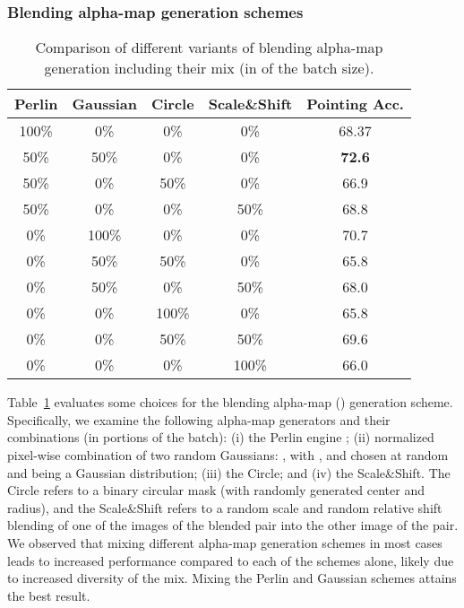 \documentclass[10pt,twocolumn,letterpaper]{article}
\newcommand\secvspace{\vspace{-0.0cm}}
\newcommand\figvspace{\vspace{-0.2cm}}
\begin{document}
\subsubsection{Blending alpha-map generation schemes}\label{sec:abl_alpha}
\secvspace
\begin{table}[h]
\begin{center}
\begin{tabular}{ ccccc }


 \toprule
 Perlin & Gaussian & Circle & Scale\&Shift & Pointing Acc.\\ 
 \midrule
 100\% & 0\% & 0\% & 0\% & 68.37 \\
 50\% & 50\% & 0\% & 0\% & \textbf{72.6} \\
50\% & 0\%& 50\% & 0\% &  66.9\\
 50\% & 0\%& 0\% & 50\% &  68.8\\
 0\% & 100\% & 0\% & 0\% & 70.7\\
0\%& 50\% & 50\% & 0\% & 65.8\\
 0\% & 50\% & 0\% & 50\% & 68.0\\
0\% & 0\% & 100\% & 0\% & 65.8\\
 0\% & 0\% & 50\% & 50\% & 69.6\\
 0\% & 0\% & 0\% & 100\% & 66.0 \\
\bottomrule
\end{tabular}
\end{center}
\caption{Comparison of different variants of blending alpha-map generation including their mix (in  of the batch size). 
}
\figvspace
\label{tab:alpha_ablation_supp}
\end{table}
 Table~\ref{tab:alpha_ablation_supp} evaluates some choices for the blending alpha-map () generation scheme. Specifically, we examine the following alpha-map generators and their combinations (in portions of the batch): (i) the Perlin engine \cite{perlin1985image}; (ii) normalized pixel-wise combination of two random Gaussians: , with , and  chosen at random and  being a Gaussian distribution; (iii) the Circle; and (iv) the Scale\&Shift. The Circle refers to a binary circular mask (with randomly generated center and radius), and the Scale\&Shift refers to a random scale and random relative shift blending of one of the images of the blended pair into the other image of the pair.
We observed that mixing different alpha-map generation schemes in most cases leads to increased performance compared to each of the schemes alone, likely due to increased diversity of the mix. Mixing the Perlin and Gaussian schemes attains the best result.
\end{document}
